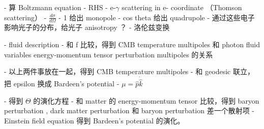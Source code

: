 - 算 Boltzmann equation
	- RHS 
		- e-$\gamma$  scattering in e- coordinate （Thomson scattering）
			- $\frac{d \sigma}{d \Omega}$ 
				- 1 给出 monopole 
				- cos theta 给出 quadrupole   
				- 通过这些电子影响光子的分布，给光子 anisotropy ？ 
		- 洛伦兹变换 

- fluid description 
- 和 f 比较，得到 CMB temperature multipoles 和 photon fluid variables energy-momentum tensor perturbation multipoles 的关系 

- 以上两件事放在一起，得到 CMB temperature multipoles 
- 和 geodesic 联立，把 epsilon 换成 Bardeen’s potential 
- $\mu = \hat{p} \dot \hat{k}$ 

- 得到 $\Theta$ 的演化方程 
- 和 matter 的 energy-momentum tensor 比较，得到 baryon perturbation , dark matter perturbation 和  baryon perturbation 差一个散射项 
- Einstein field equation 得到 Bardeen’s potential 的演化。
